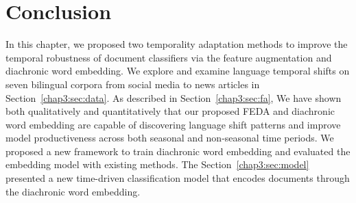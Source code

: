 \section{Conclusion}
\label{chap3:sec:conclusion}

In this chapter, we proposed two temporality adaptation methods to improve the temporal robustness of document classifiers via the feature augmentation and diachronic word embedding.
We explore and examine language temporal shifts on seven bilingual corpora from social media to news articles in Section~\ref{chap3:sec:data}. 
As described in Section~\ref{chap3:sec:fa}, We have shown both qualitatively and quantitatively that our proposed FEDA and diachronic word embedding are capable of discovering language shift patterns and improve model productiveness across both seasonal and non-seasonal time periods.
We proposed a new framework to train diachronic word embedding and evaluated the embedding model with existing methods.
The Section~\ref{chap3:sec:model} presented a new time-driven classification model that encodes documents through the diachronic word embedding. 

